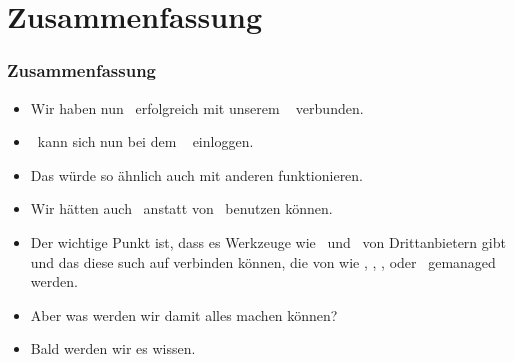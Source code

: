 \documentclass[aspectratio=169,mathserif,notheorems]{beamer}%
\begin{document}
\section{Zusammenfassung}%
%
\begin{frame}%
\frametitle{Zusammenfassung}%
\begin{itemize}%
\item Wir haben nun \libreofficeBase\ erfolgreich mit unserem \postgresql\  verbunden.%
%
\item<2-> \libreofficeBase\ kann sich nun bei dem \postgresql\  einloggen.%
%
\item<3-> Das würde so ähnlich auch mit anderen  funktionieren.%
%
\item<4-> Wir hätten auch \microsoftAccess\ anstatt von \libreofficeBase\ benutzen können.%
%
\item<5-> Der wichtige Punkt ist, dass es Werkzeuge wie \microsoftAccess\ und \libreofficeBase\ von Drittanbietern gibt und das diese such auf  verbinden können, die von  wie \postgresql, , \oracleDB, oder \microsoftSqlServer\ gemanaged werden.%
%
\item<6-> Aber was werden wir damit alles machen können?%
\item<7-> Bald werden wir es wissen.%
\end{itemize}%
\end{frame}%
%
\endPresentation%
\end{document}
